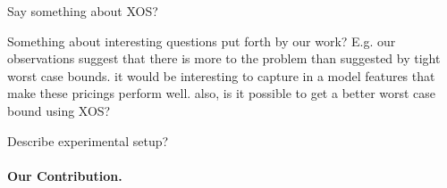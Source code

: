 Say something about XOS?

Something about interesting questions put forth by our work? E.g. our observations suggest that there is more to the problem than suggested by tight worst case bounds. it would be interesting to capture in a model features that make these pricings perform well. also, is it possible to get a better worst case bound using XOS?

Describe experimental setup?




\paragraph{Our Contribution.}







